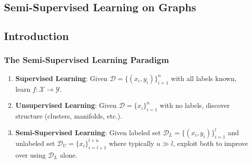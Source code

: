 \begin{notechapter}
\chapter{Semi-Supervised Learning on Graphs}\label{ch:semi-supervised-graphs}

\begin{abstract}
This document provides a self-contained, mathematically rigorous treatment of
semi-supervised learning on graph-structured data. Starting from first
principles, we develop all necessary background---graph Laplacians, spectral
theory, reproducing kernel Hilbert spaces, random walks---before presenting the
core methods: label propagation, label spreading, correct \& smooth, graph
regularization, graph neural networks, and self-supervised pretraining. Every
theorem is stated with precise hypotheses and proved in full (longer proofs
are deferred to appendices). Numerical examples and figures accompany all
major results. The document is designed for self-study: no concept is used
before it is defined.
\end{abstract}

\section{Introduction}

\subsection{The Semi-Supervised Learning Paradigm}

\begin{definition}
\label{semi-supervised-graphs:def:paradigms}
\leavevmode
\begin{enumerate}
    \item \textbf{Supervised Learning}: Given $\mathcal{D} = \{(x_i, y_i)\}_{i=1}^n$
      with all labels known, learn $f: \mathcal{X} \to \mathcal{Y}$.
    \item \textbf{Unsupervised Learning}: Given $\mathcal{D} = \{x_i\}_{i=1}^n$
      with no labels, discover structure (clusters, manifolds, etc.).
    \item \textbf{Semi-Supervised Learning}: Given labeled set
      $\mathcal{D}_L = \{(x_i, y_i)\}_{i=1}^l$ and unlabeled set
      $\mathcal{D}_U = \{x_i\}_{i=l+1}^{l+u}$ where typically $u \gg l$,
      exploit both to improve over using $\mathcal{D}_L$ alone.
\end{enumerate}
\end{definition}


\end{notechapter}
